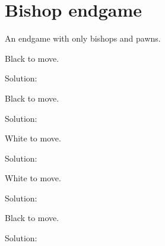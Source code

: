 \documentclass{book}
\begin{document}
\section{Bishop endgame}
An endgame with only bishops and pawns.\begin{multicols}{2} 
\begin{samepage} 
\newgame 


 
\showboard
 
 Black to move. 
 
Solution: 
 
\end{samepage}\begin{samepage} 
\newgame 


 
\showboard
 
 Black to move. 
 
Solution: 
 
\end{samepage}\begin{samepage} 
\newgame 


 
\showboard
 
 White to move. 
 
Solution: 
 
\end{samepage}\begin{samepage} 
\newgame 


 
\showboard
 
 White to move. 
 
Solution: 
 
\end{samepage}\begin{samepage} 
\newgame 


 
\showboard
 
 Black to move. 
 
Solution: 
 
\end{samepage}\end{multicols} 
\newpage 
\end{document}
